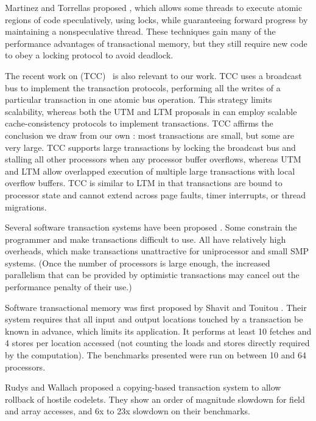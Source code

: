 Martinez and Torrellas proposed 
\cite{MartinezTo02}, which allows some threads to execute atomic
regions of code speculatively, using locks, while guaranteeing forward
progress by maintaining a nonspeculative thread.  These techniques
gain many of the performance advantages of transactional memory, but
they still require new code to obey a locking protocol to avoid
deadlock.

The recent work on  (TCC)~\cite{HammondWoCh04} is also relevant to our work.
TCC uses a broadcast bus to implement the transaction protocols,
performing all the writes of a particular transaction in one atomic
bus operation.  This strategy limits scalability, whereas both the UTM and
LTM proposals in 
can employ scalable cache-consistency protocols to implement
transactions.  TCC affirms the conclusion we draw from our own
: most transactions are small, but some are very large.  TCC
supports large transactions by locking the broadcast bus and stalling
all other processors when any processor buffer overflows, whereas UTM
and LTM allow overlapped execution of multiple large transactions with
local overflow buffers.  TCC is similar to LTM in that transactions
are bound to processor state and cannot extend across page faults,
timer interrupts, or thread migrations.


Several software transaction systems have been proposed
\cite{ShavitTo95,RudysWa02,HerlihyLuMoSc03,HarrisFr03}.  Some constrain the
programmer and make transactions difficult to use.  All have
relatively high overheads, which make transactions unattractive for
uniprocessor and small SMP systems. (Once the number of processors is
large enough, the increased parallelism that can be provided by
optimistic transactions may cancel out the performance penalty of
their use.)

Software transactional memory was first proposed by
Shavit and Touitou \cite{ShavitTo95}.  Their system requires that all
input and output locations touched by a transaction be known in
advance, which limits its application.  It performs at least 10
fetches and 4 stores per location accessed (not counting the loads and
stores directly required by the computation).  The benchmarks
presented were run on between 10 and 64 processors.

Rudys and Wallach \cite{RudysWa02} proposed a copying-based
transaction system to allow rollback of hostile codelets.
They show an order of magnitude slowdown for field and array
accesses, and 6x to 23x slowdown on their benchmarks.

